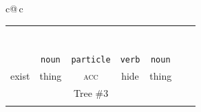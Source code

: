 \documentclass[a4paper,landscape,headrule,footrule,xetex]{foils}
\newcommand{\sa}[2]{\rnode{c#1}{\iz{#2}}}%
\begin{document}
{\begin{tabular}{c@{\,}c}
 \begin{tabular}{ccccccc}
    &\multicolumn{5}{c}{\sa{1}{NP-frag}}  \\[1ex]
    &\multicolumn{5}{c}{\sa{2}{\wl{rel-cl-sbj-gap}}}  \\[1ex]
    &\multicolumn{3}{c}{\sa{3}{hd-complement}} & \sa{4}{N} \\[1ex]
    \multicolumn{3}{c}{\sa{5}{hd-complement}} & \multicolumn{1}{c}{\sa{J}{V}} &
    \\[1ex]
    \multicolumn{2}{c}{\sa{I}{\ul{rel-cl-sbj-gap}}} & & &  & \\[1ex]
    \sa{H}{V} & \sa{7}{N}      & \sa{8}{CASE-P} &   &  \\[1ex]
    \sa{G}{ある} & \sa{B}{物事} & \sa{C}{を} & \sa{D}{隠す} &  \sa{F}{ 物} \\
   \texttt{\emp{\ul{verb}}} & \texttt{noun} & \texttt{particle} & \texttt{verb} & \texttt{noun} \\
    exist & thing &  \textsc{acc} & hide &  thing \\
   \multicolumn{5}{c}{Tree \#3} \\ \\
 \end{tabular}
  \centering
   
   
   
    
   
   



\end{tabular}}
\end{document}
